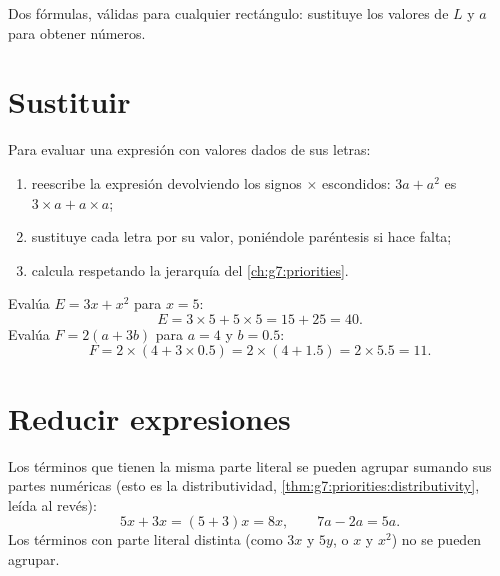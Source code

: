 \begin{omfigure}

{\small Dos fórmulas, válidas para cualquier rectángulo: sustituye los valores
de $L$ y $a$ para obtener números.}
\end{omfigure}

\section{Sustituir}

\begin{method}\label{met:g7:literal:substitute}
Para evaluar una expresión con valores dados de sus letras:
\begin{enumerate}
  \item reescribe la expresión devolviendo los signos $\times$ escondidos:
        $3a + a^2$ es $3 \times a + a \times a$;
  \item sustituye cada letra por su valor, poniéndole paréntesis
        si hace falta;
  \item calcula respetando la jerarquía del
        \cref{ch:g7:priorities}.
\end{enumerate}
\end{method}

\begin{example}\label{ex:g7:literal:substitute}
Evalúa $E = 3x + x^2$ para $x = 5$:
\[
E = 3 \times 5 + 5 \times 5 = 15 + 25 = 40 .
\]
Evalúa $F = 2(a + 3b)$ para $a = 4$ y $b = 0.5$:
\[
F = 2 \times (4 + 3 \times 0.5) = 2 \times (4 + 1.5) = 2 \times 5.5
= 11 .
\]
\end{example}

\section{Reducir expresiones}

\begin{proposition}\label{prop:g7:literal:reduce}
Los términos que tienen la misma parte literal se pueden agrupar sumando sus
partes numéricas (esto es la distributividad,
\cref{thm:g7:priorities:distributivity}, leída al revés):
\[
5x + 3x = (5 + 3)x = 8x,
\qquad
7a - 2a = 5a .
\]
Los términos con parte literal distinta (como $3x$ y $5y$, o $x$ y
$x^2$) no se pueden agrupar.
\end{proposition}

